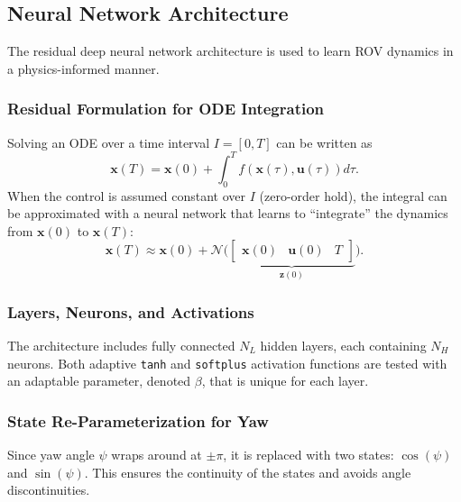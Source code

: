 \subsection{Neural Network Architecture}
\label{sec:nn_arch}
The residual deep neural network architecture is used to learn ROV dynamics in a physics-informed manner.
\subsubsection{Residual Formulation for ODE Integration}
Solving an ODE over a time interval $I = [0,T]$ can be written as
\begin{equation}
    \mathbf{x}(T) = \mathbf{x}(0) + \int_0^T f(\mathbf{x}(\tau), \mathbf{u}(\tau)) d\tau.
\end{equation}
When the control is assumed constant over $I$ (zero-order hold), the integral can be approximated with a neural network that learns to “integrate” the dynamics from $\mathbf{x}(0)$ to $\mathbf{x}(T)$:
\begin{equation}
    \mathbf{x}(T) \approx \mathbf{x}(0) + \mathcal{N}\bigl(\underbrace{\begin{bmatrix}
    \mathbf{x}(0) & \mathbf{u}(0) & T
\end{bmatrix}}_{\mathbf{z}(0)}\bigr).
\end{equation}

\subsubsection{Layers, Neurons, and Activations}
The architecture includes fully connected $N_L$ hidden layers, each containing $N_H$ neurons. Both adaptive \lstinline|tanh| and \lstinline|softplus| activation functions are tested with an adaptable parameter, denoted $\beta$, that is unique for each layer.

\subsubsection{State Re-Parameterization for Yaw}
Since yaw angle $\psi$ wraps around at $\pm\pi$, it is replaced with two states: $\cos(\psi)$ and $\sin(\psi)$. This ensures the continuity of the states and avoids angle discontinuities. 

